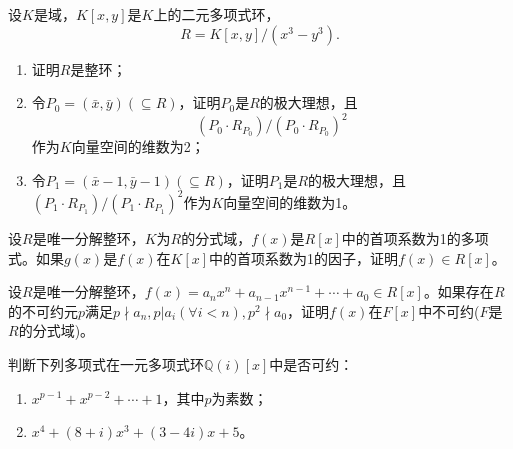 \begin{prob}
设$K$是域，$K[x,y]$是$K$上的二元多项式环，
\begin{equation*}
R=K[x,y]/\left(x^{3}-y^{3}\right).
\end{equation*}
\begin{enumerate}[$(1)$]
\item 证明$R$是整环；
\item 令$P_{0}=\left(\bar{x},\bar{y}\right)\left(\subseteq R\right)$，证明$P_{0}$是$R$的极大理想，且
\begin{equation*}
\left(P_{0}\cdot R_{P_{0}}\right)/\left(P_{0}\cdot R_{P_{0}}\right)^{2}
\end{equation*}
作为$K$向量空间的维数为2；
\item 令$P_{1}=\left(\bar{x}-1,\bar{y}-1\right)\left(\subseteq R\right)$，证明$P_{1}$是$R$的极大理想，且$\left(P_{1}\cdot R_{P_{1}}\right)/\left(P_{1}\cdot R_{P_{1}}\right)^{2}$作为$K$向量空间的维数为1。
\end{enumerate}
\end{prob}
\begin{prob}
设$R$是唯一分解整环，$K$为$R$的分式域，$f\left(x\right)$是$R[x]$中的首项系数为1的多项式。如果$g\left(x\right)$是$f\left(x\right)$在$K[x]$中的首项系数为1的因子，证明$f\left(x\right)\in R\left[x\right]$。
\end{prob}
\begin{tcolorbox}[breakable,colback=shadecolor,colframe=framecolor,title=\textbf{问题\arabic{problemname}.}({\bfseries Eisenstein判别法})]
设$R$是唯一分解整环，$f\left(x\right)=a_{n}x^{n}+a_{n-1}x^{n-1}+\cdots +a_{0}\in R\left[x\right]$。如果存在$R$的不可约元$p$满足$p\nmid a_{n},p\vert a_{i}\left(\forall i<n\right),p^{2}\nmid a_{0}$，证明$f\left(x\right)$在$F\left[x\right]$中不可约($F$是$R$的分式域)。
\end{tcolorbox}\par
\begin{prob}
判断下列多项式在一元多项式环$\mathbb{Q}\left(i\right)\left[x\right]$中是否可约：
\begin{enumerate}[$\left(1\right)$]
\item $x^{p-1}+x^{p-2}+\cdots +1$，其中$p$为素数；
\item $x^{4}+\left(8+i\right)x^{3}+\left(3-4i\right)x+5$。
\end{enumerate}
\end{prob}
